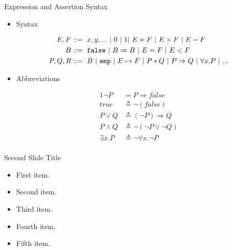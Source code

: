 \documentclass{beamer}
\newcommand{\btt}[1]{
  \mbox{\bm{$\mathtt{#1}$}}
}
\begin{document}
\begin{frame}{Expression and Assertion Syntax}
  \begin{itemize}
    \item {
      Syntax

      \begin{alignat*}{1}
        E, F &::=\ x, y, ...\ |\ 0\ |\ 1 |\ E + F\ |\ E \times F\ |\ E - F \\
        B &::=\ \btt{false}\ |\ B \Rightarrow B\ |\ E = F\ |\ E < F \\
        P, Q, R &::=\ B\ |\ \btt{emp}\ |\ E \mapsto F\ |\ P * Q\ |\ P \Rightarrow Q\ |\ \forall x.P\ |\ ...
      \end{alignat*}
    }

    \item {
      Abbreviations

      \begin{alignat*}{1}
        \neg P &= P \Rightarrow false\\
        true &\triangleq \neg(false)\\
        P \lor Q &\triangleq (\neg P) \Rightarrow Q\\
        P \land Q &\triangleq \neg (\neg P \lor \neg Q)\\
        \exists x. P &\triangleq \neg \forall x.\neg P \\
      \end{alignat*}
    }
  \end{itemize}
\end{frame}

\begin{frame}{Second Slide Title}
  \begin{itemize}
  \item {
    First item.
    \pause %
  }
  \item {
    Second item.
  }
  \item<3-> {
    Third item.
  }
  \item<4-> {
    Fourth item.
  }
  \item<5-> {
    Fifth item. 
  }
  \end{itemize}
\end{frame}
\end{document}
